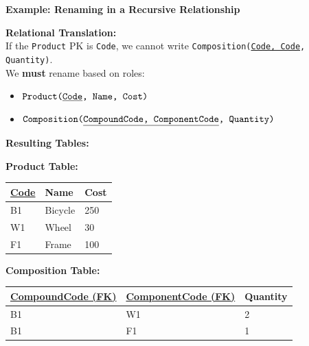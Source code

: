 \vspace{0.2cm}
\begin{example}{\textbf{Example: Renaming in a Recursive Relationship}}

    \textbf{Relational Translation:}\\
If the \texttt{Product} PK is \texttt{Code}, we cannot write \texttt{Composition(\underline{Code, Code}, Quantity)}. \\
We \textbf{must} rename based on roles:
\begin{itemize}
    \item $\texttt{Product(\underline{Code}, Name, Cost)}$
    \item $\texttt{Composition(\underline{CompoundCode, ComponentCode}, Quantity)}$
\end{itemize}

\begin{center}
\end{center}



\vs
\textbf{Resulting Tables:}

\textbf{Product Table:}
\begin{center}
\begin{tabular}{|l|l|l|}
\hline
\textbf{\underline{Code}} & \textbf{Name} & \textbf{Cost} \\
\hline
B1 & Bicycle & 250 \\
W1 & Wheel & 30 \\
F1 & Frame & 100 \\
\hline
\end{tabular}
\end{center}

\textbf{Composition Table:}
\begin{center}
\begin{tabular}{|l|l|l|}
\hline
\textbf{\underline{CompoundCode (FK)}} & \textbf{\underline{ComponentCode (FK)}} & \textbf{Quantity} \\
\hline
B1 & W1 & 2 \\
B1 & F1 & 1 \\
\hline
\end{tabular}
\end{center}

\end{example}

